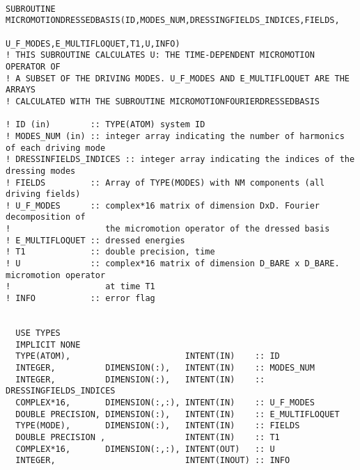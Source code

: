 \documentclass[10pt,a4paper]{article}
\begin{document}
\begin{verbatim}

SUBROUTINE MICROMOTIONDRESSEDBASIS(ID,MODES_NUM,DRESSINGFIELDS_INDICES,FIELDS,
                                                 U_F_MODES,E_MULTIFLOQUET,T1,U,INFO) 
! THIS SUBROUTINE CALCULATES U: THE TIME-DEPENDENT MICROMOTION OPERATOR OF 
! A SUBSET OF THE DRIVING MODES. U_F_MODES AND E_MULTIFLOQUET ARE THE ARRAYS
! CALCULATED WITH THE SUBROUTINE MICROMOTIONFOURIERDRESSEDBASIS

! ID (in)        :: TYPE(ATOM) system ID
! MODES_NUM (in) :: integer array indicating the number of harmonics of each driving mode
! DRESSINFIELDS_INDICES :: integer array indicating the indices of the dressing modes
! FIELDS         :: Array of TYPE(MODES) with NM components (all driving fields)
! U_F_MODES      :: complex*16 matrix of dimension DxD. Fourier decomposition of 
!                   the micromotion operator of the dressed basis
! E_MULTIFLOQUET :: dressed energies
! T1             :: double precision, time
! U              :: complex*16 matrix of dimension D_BARE x D_BARE. micromotion operator
!                   at time T1
! INFO           :: error flag


  USE TYPES
  IMPLICIT NONE
  TYPE(ATOM),                       INTENT(IN)    :: ID
  INTEGER,          DIMENSION(:),   INTENT(IN)    :: MODES_NUM
  INTEGER,          DIMENSION(:),   INTENT(IN)    :: DRESSINGFIELDS_INDICES
  COMPLEX*16,       DIMENSION(:,:), INTENT(IN)    :: U_F_MODES
  DOUBLE PRECISION, DIMENSION(:),   INTENT(IN)    :: E_MULTIFLOQUET
  TYPE(MODE),       DIMENSION(:),   INTENT(IN)    :: FIELDS
  DOUBLE PRECISION ,                INTENT(IN)    :: T1
  COMPLEX*16,       DIMENSION(:,:), INTENT(OUT)   :: U
  INTEGER,                          INTENT(INOUT) :: INFO
  

\end{verbatim}
\end{document}
